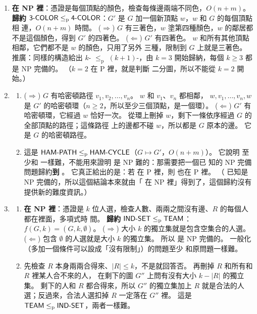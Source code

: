 \begin{enumerate}
\item \textbf{在 NP 裡}：憑證是每個頂點的顏色，檢查每條邊兩端不同色，$O(n + m)$。 \textbf{歸約
$\textsf{3-COLOR} \le_{\mathrm{p}} \textsf{4-COLOR}$}：$G'$ 是 $G$ 加一個新頂點 $w$，$w$ 和 $G$ 的每個頂點相
連，$O(n + m)$ 時間。 ($\Rightarrow$) $G$ 有三著色，$w$ 塗第四種顏色，$w$ 的鄰居都不是這個顏色，得到
$G'$ 的四著色。 ($\Leftarrow$) $G'$ 有四著色。 $w$ 和所有其他頂點相鄰，它們都不是 $w$ 的顏色，只用了另外
三種，限制到 $G$ 上就是三著色。 推廣：同樣的構造給出 $k$- $\le_{\mathrm{p}}$
$(k+1)$-，由 $k = 3$ 開始歸納，每個 $k \ge 3$ 都是 NP 完備的。 （$k = 2$ 在 P 裡，就是判斷
二分圖，所以不能從 $k = 2$ 開始。）

\item
\begin{enumerate}
\item ($\Rightarrow$) $G$ 有哈密頓路徑 $v_1, v_2, \ldots, v_n$。 $w$ 和 $v_1$、$v_n$ 都相鄰，
$w, v_1, \ldots, v_n, w$ 是 $G'$ 的哈密頓環（$n \ge 2$，所以至少三個頂點，是一個環）。 ($\Leftarrow$)
$G'$ 有哈密頓環，它經過 $w$ 恰好一次。 從環上刪掉 $w$，剩下一條依序經過 $G$ 的全部頂點的路徑；這條路徑
上的邊都不碰 $w$，所以都是 $G$ 原本的邊。 它是 $G$ 的哈密頓路徑。
\item 這是 $\textsf{HAM-PATH} \le_{\mathrm{p}} \textsf{HAM-CYCLE}$（$G \mapsto G'$，$O(n + m)$）。 它說明
 至少和  一樣難，不能用來證明  是 NP 難的：那需要把一個已
知的 NP 完備問題歸約\textbf{到} 。 它真正給出的是：若  在 P 裡，則
 也在 P 裡。 （ 已知是 NP 完備的，所以這個結論本來就由「
在 NP 裡」得到了，這個歸約沒有提供新的難度資訊。）
\end{enumerate}

\item
\begin{enumerate}
\item \textbf{在 NP 裡}：憑證是 $k$ 位人選，檢查人數、兩兩之間沒有邊、$R$ 的每個人都在裡面，多項式時
間。 \textbf{歸約 $\textsf{IND-SET} \le_{\mathrm{p}} \textsf{TEAM}$}：$f(G, k) = (G, k, \emptyset)$。
($\Rightarrow$) 大小 $k$ 的獨立集就是包含空集合的人選。 ($\Leftarrow$) 包含 $\emptyset$ 的人選就是大小
$k$ 的獨立集。 所以  是 NP 完備的。 一般化（多加一個條件可以設成「沒有限制」）的問題至少
和原問題一樣難。
\item 先檢查 $R$ 本身兩兩合得來、$|R| \le k$，不是就回答否。 再刪掉 $R$ 和所有和 $R$ 裡某人合不來的人，
在剩下的圖 $G''$ 上問有沒有大小 $k - |R|$ 的獨立集。 剩下的人和 $R$ 都合得來，所以 $G''$ 的獨立集加上
$R$ 就是合法的人選；反過來，合法人選扣掉 $R$ 一定落在 $G''$ 裡。 這是
$\textsf{TEAM} \le_{\mathrm{p}} \textsf{IND-SET}$，兩者一樣難。
\end{enumerate}


\end{enumerate}
